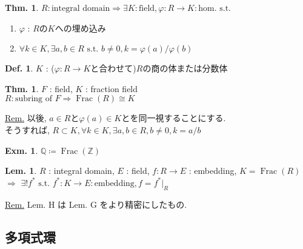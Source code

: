 \documentclass[uplatex,dvipdfmx,9pt]{beamer}
\newcommand{\st}{\text{ s.t. }}
\newcommand{\Frac}[1]{\operatorname{Frac}(#1)}
\renewcommand{\hom}{\text{hom.}} %
\newcommand{\Z}{\mathbb{Z}}
\newcommand{\Q}{\mathbb{Q}}
\newcommand{\sscount}{\textsection \thesubsection}
\newcounter{textThmCount}
\newcounter{textLemCount}
\newcounter{textExmCount}
\theoremstyle{definition} %
\newtheorem{defn}{Def.}[subsection] %
\newtheorem{thm}{Thm.}[subsection] %
\newtheorem{thmText}[textThmCount]{Thm.}
\newtheorem{lemText}[textLemCount]{Lem.} %
\theoremstyle{example}
\newtheorem{exm}{Exm.}[subsection]
\begin{document}
    \begin{frame}

      \begin{thmText}
        $R : \text{integral domain} \Rightarrow \exists K : \text{field}, \varphi\colon R \to K : \hom \st$
        \begin{enumerate}
          \item $\varphi$ : $R$の$K$への埋め込み
          \item $\forall k \in K, \exists a, b \in R \st b \neq 0, k = \varphi(a) / \varphi(b)$
        \end{enumerate}
      \end{thmText}

      \begin{defn}
        $K$ : ($\varphi\colon R \to K$と合わせて)$R$の\alert{商の体}または\alert{分数体}
      \end{defn}

      \begin{thm}
        $F$ : field, $K$ : fraction field \\
        $R : \text{subring of $F$} \Rightarrow \Frac{R} \cong K$
      \end{thm}
      \underline{Rem.} 以後, $a \in R$と$\varphi(a) \in K$とを同一視することにする. \\
      そうすれば, $R \subset K, \forall k \in K, \exists a, b \in R, b \neq 0, k = a/b$

      \begin{exm}
        $\Q \coloneqq \Frac{\Z}$
      \end{exm}
      
    \end{frame}

    \begin{frame}

      \begin{lemText}
        $R$ : integral domain, $E$ : field, $f\colon R \to E$ : embedding, $K = \Frac{R}$ \\
        $\Rightarrow$ $\exists! f^* \st f^*\colon K \to E : \text{embedding}, f = f^*\vert_R$
      \end{lemText}
      \underline{Rem.} Lem. H は Lem. G をより精密にしたもの.
      
    \end{frame}

    \subsection{\sscount 多項式環}
    \setcounter{textExmCount}{0}
\end{document}
